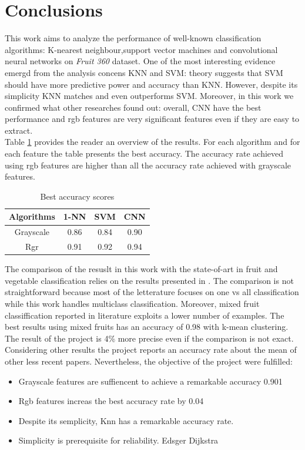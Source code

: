 \documentclass{article}
\begin{document}
\section{Conclusions}
This work aims to analyze the performance of well-known classification algorithms: K-nearest neighbour,support vector machines and convolutional neural networks on \textit{Fruit 360} dataset. One of the most interesting evidence emergd from the analysis concens KNN and SVM:
theory suggests that SVM should have more predictive power and accuracy than KNN. However, despite its simplicity KNN matches and even outperforms SVM. Moreover, in this work we confirmed what other researches found out: overall, CNN have the best performance and rgb features are very significant features even if they are easy to extract.\\
Table \ref{results} provides the reader an overview of the results. For each algorithm and for each feature the table presents the best accuracy.
The accuracy rate achieved using rgb features are higher than all the accuracy rate achieved with grayscale features. \\
\begin{table}[H]
\centering
 \begin{tabular}{|c|c|c|c|} 
 \hline
  Algorithms & 1-NN & SVM & CNN\\
 \hline
 Grayscale&0.86&0.84&0.90 \\
 \hline
 Rgr&0.91& 0.92 & 0.94  \\
 \hline
\end{tabular}
\caption{Best accuracy scores} \label{results}
\end{table}

\noindent The comparison of the resuslt in this work with the state-of-art in fruit and vegetable classification relies on the results presented in \cite{review}. The comparison is not straightforward because most of the letterature focuses on one vs all classification while this work handles multiclass classification. Moreover, mixed fruit classiffication reported in literature  exploits a lower number of examples. The best results using mixed fruits has an accuracy of 0.98 with k-mean clustering. The result of the project is 4\% more precise even if the comparison is not exact. 
Considering other results the project reports an accuracy rate about the mean of other less recent papers.
Nevertheless, the objective of the project were fulfilled:
\begin{itemize}
\item Grayscale features are suffiencent to achieve a remarkable accuracy 0.901
\item Rgb features increas the best accuracy rate by 0.04
\item Despite its semplicity, Knn has a remarkable accuracy rate. 
\item Simplicity is prerequisite for reliability. Edsger Dijkstra
\end{itemize}
\end{document}
